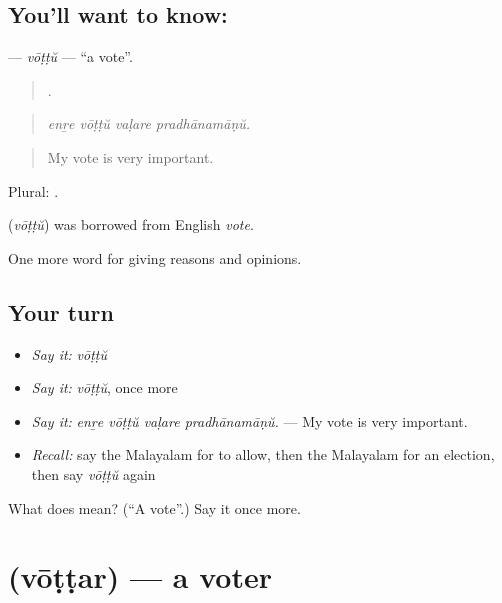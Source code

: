 \subsection*{You'll want to know: }
\textbf{} — \emph{vōṭṭŭ} — \textquotedblleft{}a vote\textquotedblright{}.

\begin{quote}
   .
\end{quote}

\begin{quote}
\emph{enṟe vōṭṭŭ vaḷare pradhānamāṇŭ.}
\end{quote}

\begin{quote}
My vote is very important.
\end{quote}

Plural: .

\begin{cousinweb}
\textbf{} (\emph{vōṭṭŭ}) was borrowed from English \emph{vote}.
\end{cousinweb}

\begin{grammarlens}[title={What you've built}]
One more word for giving reasons and opinions.
\end{grammarlens}

\subsection*{Your turn}
\begin{itemize}
\raggedright
  \item \emph{Say it:} \emph{vōṭṭŭ}
  \item \emph{Say it:} \emph{vōṭṭŭ}, once more
  \item \emph{Say it:} \emph{enṟe vōṭṭŭ vaḷare pradhānamāṇŭ.} — My vote is very important.
  \item \emph{Recall:} say the Malayalam for to allow, then the Malayalam for an election, then say \emph{vōṭṭŭ} again
\end{itemize}

\begin{tcolorbox}[breakable,colback=teal!4,colframe=teal!35!black,title={Before you move on}]
What does  mean? (\textquotedblleft{}A vote\textquotedblright{}.) Say it once more.
\end{tcolorbox}
\section[\texorpdfstring{\ml{വോട്ടർ} (vōṭṭar)}{വോട്ടർ (vōṭṭar)}]{ (vōṭṭar) — a voter}

